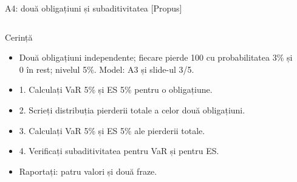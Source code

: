 \begin{frame}{A4: două obligațiuni și subaditivitatea [Propus]}
\propsub
\itemsize{\scriptsize}
\begin{columns}[T]
\begin{column}{\taskw}
\begin{block}{Cerință}
\begin{itemize}
    \item Două obligațiuni independente; fiecare pierde 100 cu probabilitatea 3\% și 0 în rest; nivelul 5\%. Model: A3 și slide-ul 3/5.
    \item 1. Calculați VaR 5\% și ES 5\% pentru o obligațiune.
    \item 2. Scrieți distribuția pierderii totale a celor două obligațiuni.
    \item 3. Calculați VaR 5\% și ES 5\% ale pierderii totale.
    \item 4. Verificați subaditivitatea pentru VaR și pentru ES.
    \item Raportați: patru valori și două fraze.
\end{itemize}
\end{block}
\end{column}
\begin{column}{\solw}
\end{column}
\end{columns}
\end{frame}

